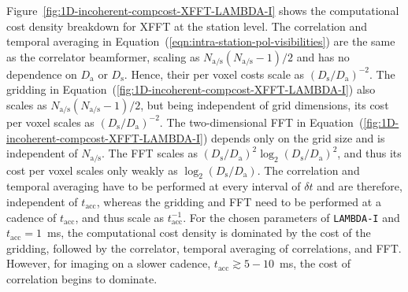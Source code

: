 \documentclass[
  journal=pasa,
  manuscript=article-type,
  year=2020,
  volume=37,
]{cup-journal}
\begin{document}


Figure~\ref{fig:1D-incoherent-compcost-XFFT-LAMBDA-I} shows the computational cost density breakdown for XFFT at the station level. The correlation and temporal averaging in Equation~(\ref{eqn:intra-station-pol-visibilities}) are the same as the correlator beamformer, scaling as $N_\textrm{a/s}(N_\textrm{a/s}-1)/2$ and has no dependence on $D_\textrm{a}$ or $D_\textrm{s}$. Hence, their per voxel costs scale as $(D_\textrm{s}/D_\textrm{a})^{-2}$. The gridding in Equation~(\ref{fig:1D-incoherent-compcost-XFFT-LAMBDA-I}) also scales as $N_\textrm{a/s}(N_\textrm{a/s}-1)/2$, but being independent of grid dimensions, its cost per voxel scales as $(D_\textrm{s}/D_\textrm{a})^{-2}$. The two-dimensional FFT in Equation~(\ref{fig:1D-incoherent-compcost-XFFT-LAMBDA-I}) depends only on the grid size and is independent of $N_\textrm{a/s}$. The FFT scales as $(D_\textrm{s}/D_\textrm{a})^2\log_2(D_\textrm{s}/D_\textrm{a})^2$, and thus its cost per voxel scales only weakly as $\log_2(D_\textrm{s}/D_\textrm{a})$. The correlation and temporal averaging have to be performed at every interval of $\delta t$ and are therefore, independent of $t_\textrm{acc}$, whereas the gridding and FFT need to be performed at a cadence of $t_\textrm{acc}$, and thus scale as $t_\textrm{acc}^{-1}$. For the chosen parameters of \texttt{LAMBDA-I} and $t_\textrm{acc}=1$~ms, the computational cost density is dominated by the cost of the gridding, followed by the correlator, temporal averaging of correlations, and FFT. However, for imaging on a slower cadence, $t_\textrm{acc}\gtrsim 5-10$~ms, the cost of correlation begins to dominate. 
\end{document}
